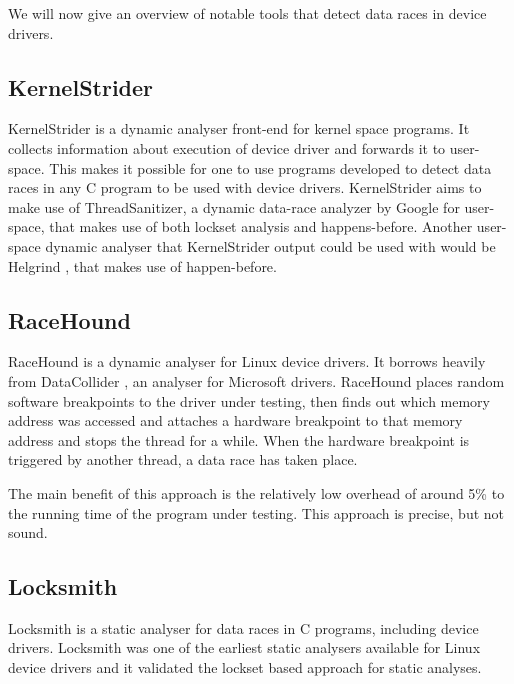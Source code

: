 \documentclass[..thesis.tex]{subfiles}
\begin{document}
We will now give an overview of notable tools that detect data races in device drivers.


\subsection{KernelStrider}

KernelStrider\cite{shatokhin_kernel} is a dynamic analyser front-end for kernel space programs. It collects information about execution of device driver and forwards it to user-space. This makes it possible for one to use programs developed to detect data races in any C program to be used with device drivers. KernelStrider aims to make use of ThreadSanitizer\cite{serebryany_threadsanitizer_2009}, a dynamic data-race analyzer by Google for user-space, that makes use of both lockset analysis and happens-before. Another user-space dynamic analyser that KernelStrider output could be used with would be Helgrind ,\cite{_helgrind,nethercote_valgrind_2007} that makes use of happen-before.


\subsection{RaceHound}

RaceHound\cite{komarov_implementation_2013} is a dynamic analyser for Linux device drivers. It borrows heavily from DataCollider \cite{erickson_effective_2010}, an analyser for Microsoft drivers. RaceHound places random software breakpoints to the driver under testing, then finds out which memory address was accessed and attaches a hardware breakpoint to that memory address and stops the thread for a while. When the hardware breakpoint is triggered by another thread, a data race has taken place.

The main benefit of this approach is the relatively low overhead of around 5\% to the running time of the program under testing. This approach is precise, but not sound.


\subsection{Locksmith}
Locksmith\cite{pratikakis_locksmith_2006} is a static analyser for data races in C programs, including device drivers. Locksmith was one of the earliest static analysers available for Linux device drivers and it validated the lockset based approach for static analyses. 
\end{document}
